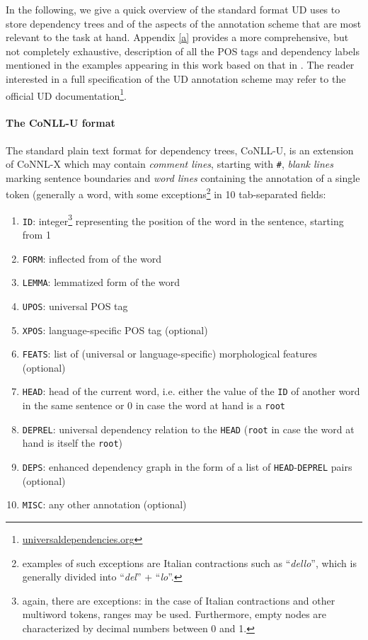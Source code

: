 In the following, we give a quick overview of the standard format UD uses to store dependency trees and of the aspects of the annotation scheme that are most relevant to the task at hand. Appendix \ref{a} provides a more comprehensive, but not completely exhaustive, description of all the POS tags and dependency labels mentioned in the examples appearing in this work based on that in \cite{compsyn}. The reader interested in a full specification of the UD annotation scheme may refer to the official UD documentation\footnote{\url{universaldependencies.org}}. 

\paragraph{The CoNLL-U format} \label{conll}
The standard plain text format for dependency trees, CoNLL-U, is an extension of CoNNL-X \cite{conllx} which may contain \textit{comment lines}, starting with \texttt{\#}, \textit{blank lines} marking sentence boundaries and \textit{word lines} containing the annotation of a single token (generally a word, with some exceptions\footnote{examples of such exceptions are Italian contractions such as ``\textit{dello}'', which is generally divided into ``\textit{del}'' + ``\textit{lo}''.} in 10 tab-separated fields: \smallskip

\begin{enumerate}
    \item \texttt{ID}: integer\footnote{again, there are exceptions: in the case of Italian contractions and other multiword tokens, ranges may be used. Furthermore, empty nodes are characterized by decimal numbers between 0 and 1.} representing the position of the word in the sentence, starting from 1
    \item \texttt{FORM}: inflected from of the word
    \item \texttt{LEMMA}: lemmatized form of the word
    \item \texttt{UPOS}: universal POS tag
    \item \texttt{XPOS}: language-specific POS tag (optional)
    \item \texttt{FEATS}: list of (universal or language-specific) morphological features (optional)
    \item \texttt{HEAD}: head of the current word, i.e. either the value of the \texttt{ID} of another word in the same sentence or 0 in case the word at hand is a \texttt{root}
    \item \texttt{DEPREL}: universal dependency relation to the \texttt{HEAD} (\texttt{root} in case the word at hand is itself the \texttt{root})
    \item \texttt{DEPS}: enhanced dependency graph in the form of a list of \texttt{HEAD}-\texttt{DEPREL} pairs (optional)
    \item \texttt{MISC}: any other annotation (optional)
\end{enumerate} \smallskip

